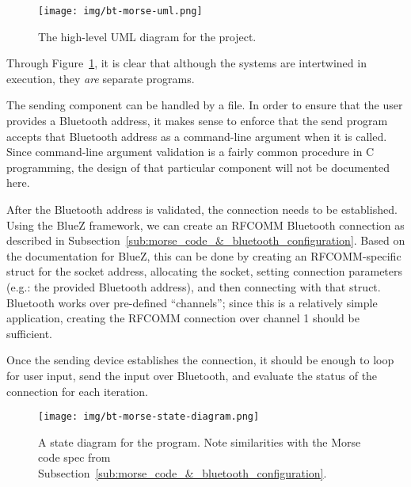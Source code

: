 \documentclass[11pt]{article}
\begin{document}
\begin{figure}[ht]
    \centering
    \texttt{[image: img/bt-morse-uml.png]}
    \caption{The high-level UML diagram for the project.}
    \label{fig:bt-morse-uml}
\end{figure}


Through Figure~\ref{fig:bt-morse-uml}, it is clear that although the systems are intertwined in execution, they \emph{are} separate programs.


The sending component can be handled by a  file.
In order to ensure that the user provides a Bluetooth address, it makes sense to enforce that the send program accepts that Bluetooth address as a command-line argument when it is called.
Since command-line argument validation is a fairly common procedure in C programming, the design of that particular component will not be documented here.


After the Bluetooth address is validated, the connection needs to be established.
Using the BlueZ framework, we can create an RFCOMM Bluetooth connection as described in Subsection~\ref{sub:morse_code_&_bluetooth_configuration}.
Based on the documentation for BlueZ, this can be done by creating an RFCOMM-specific struct for the socket address, allocating the socket, setting connection parameters (e.g.: the provided Bluetooth address), and then connecting with that struct.
Bluetooth works over pre-defined ``channels''; since this is a relatively simple application, creating the RFCOMM connection over channel 1 should be sufficient.


Once the sending device establishes the connection, it should be enough to loop for user input, send the input over Bluetooth, and evaluate the status of the connection for each iteration.




\begin{figure}[ht]
    \centering
    \texttt{[image: img/bt-morse-state-diagram.png]}
    \caption{A state diagram for the program. Note similarities with the Morse code spec from Subsection~\ref{sub:morse_code_&_bluetooth_configuration}.}
    \label{fig:bt-morse-state-diagram}
\end{figure}
\end{document}
